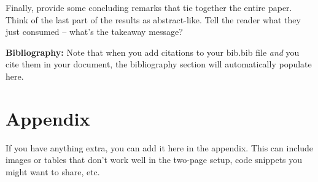\documentclass{article}\usepackage[]{graphicx}\usepackage[]{xcolor}
\begin{document}
\begin{multicols}{2}
Finally, provide some concluding remarks that tie together the entire paper. Think of the last part of the results as abstract-like. Tell the reader what they just consumed -- what's the takeaway message?

\vspace{2em}

\noindent\textbf{Bibliography:} Note that when you add citations to your bib.bib file \emph{and}
you cite them in your document, the bibliography section will automatically populate here.

\begin{tiny}

\end{tiny}

\end{multicols}

\newpage
\onecolumn
\section{Appendix}

If you have anything extra, you can add it here in the appendix. This can include images or tables that don't work well in the two-page setup, code snippets you might want to share, etc.
\end{document}
